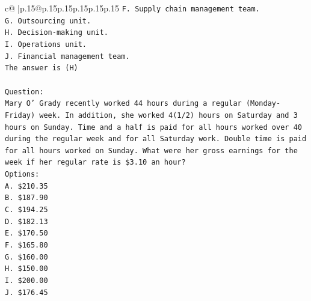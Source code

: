 \documentclass{article}
\begin{document}
{\begin{supertabular}{c@{$\;$}|p{.15\linewidth}@{}p{.15\linewidth}p{.15\linewidth}p{.15\linewidth}p{.15\linewidth}p{.15\linewidth}}
{{{\texttt{F. Supply chain management team.} \\
\texttt{G. Outsourcing unit.} \\
\texttt{H. Decision{-}making unit.} \\
\texttt{I. Operations unit.} \\
\texttt{J. Financial management team.} \\
\texttt{The answer is (H)} \\
\\ 
\texttt{Question:} \\
\texttt{Mary O' Grady recently worked 44 hours during a regular (Monday{-}Friday) week. In addition, she worked 4(1/2) hours on Saturday and 3 hours on Sunday. Time and a half is paid for all hours worked over 40 during the regular week and for all Saturday work. Double time is paid for all hours worked on Sunday. What were her gross earnings for the week if her regular rate is \$3.10 an hour?} \\
\texttt{Options:} \\
\texttt{A. \$210.35} \\
\texttt{B. \$187.90} \\
\texttt{C. \$194.25} \\
\texttt{D. \$182.13} \\
\texttt{E. \$170.50} \\
\texttt{F. \$165.80} \\
\texttt{G. \$160.00} \\
\texttt{H. \$150.00} \\
\texttt{I. \$200.00} \\
\texttt{J. \$176.45} \\
            }
        }
    }
     \\ \\


\end{supertabular}}
\end{document}
